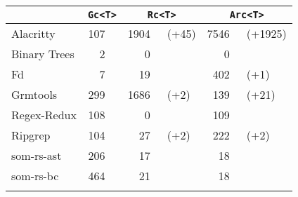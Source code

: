 \renewcommand{\arraystretch}{1.2}
\begin{tabular}{lr@{}lr@{}lr@{}l}
\toprule
  & \multicolumn{2}{c}{\texttt{Gc<T>}} & \multicolumn{2}{c}{\texttt{Rc<T>}} & \multicolumn{2}{c}{\texttt{Arc<T>}} \\
\midrule
\addlinespace[0.4em]
Alacritty & 107 & & 1904 & {\scriptsize\, (+45)} & 7546 & {\scriptsize\, (+1925)} \\
Binary Trees & 2 & & 0 & & 0 & \\
Fd  & 7 & & 19 & & 402 & {\scriptsize\, (+1)} \\
Grmtools & 299 & & 1686 & {\scriptsize\, (+2)} & 139 & {\scriptsize\, (+21)} \\
Regex-Redux & 108 & & 0 & & 109 & \\
Ripgrep & 104 & & 27 & {\scriptsize\, (+2)} & 222 & {\scriptsize\, (+2)} \\
som-rs-ast & 206 & & 17 & & 18 & \\
som-rs-bc & 464 & & 21 & & 18 & \\
\addlinespace[0.4em]
\bottomrule
\end{tabular}

